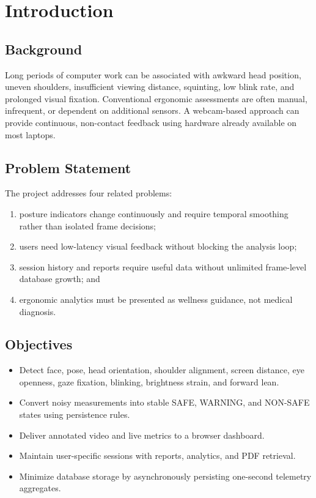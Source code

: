 \documentclass[12pt,a4paper]{report}
\begin{document}
\tableofcontents
\listoftables
\listoffigures

\chapter{Introduction}
\section{Background}
Long periods of computer work can be associated with awkward head position,
uneven shoulders, insufficient viewing distance, squinting, low blink rate,
and prolonged visual fixation. Conventional ergonomic assessments are often
manual, infrequent, or dependent on additional sensors. A webcam-based
approach can provide continuous, non-contact feedback using hardware already
available on most laptops.

\section{Problem Statement}
The project addresses four related problems:
\begin{enumerate}[label=\arabic*.]
    \item posture indicators change continuously and require temporal
    smoothing rather than isolated frame decisions;
    \item users need low-latency visual feedback without blocking the analysis
    loop;
    \item session history and reports require useful data without unlimited
    frame-level database growth; and
    \item ergonomic analytics must be presented as wellness guidance, not
    medical diagnosis.
\end{enumerate}

\section{Objectives}
\begin{itemize}
    \item Detect face, pose, head orientation, shoulder alignment, screen
    distance, eye openness, gaze fixation, blinking, brightness strain, and
    forward lean.
    \item Convert noisy measurements into stable SAFE, WARNING, and NON-SAFE
    states using persistence rules.
    \item Deliver annotated video and live metrics to a browser dashboard.
    \item Maintain user-specific sessions with reports, analytics, and PDF
    retrieval.
    \item Minimize database storage by asynchronously persisting one-second
    telemetry aggregates.
\end{itemize}
\end{document}
